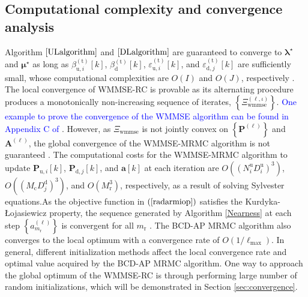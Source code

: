 \documentclass[9pt,journal]{IEEEtran}
\newcommand{\paren}[1]{\left({#1}\right)}
\newcommand{\bracket}[1]{{\left [{#1}\right ]}}
\newcommand{\braces}[1]{{\left\{ {#1}\right\}}}
\newcommand{\rr}{_\mathrm{r}}
\newcommand{\PiB}{\mathbf{P}_{\textrm{u},i}\bracket{k}}
\newcommand{\PBj}{\mathbf{P}_{\textrm{d},j}\bracket{k}}
\newcommand{\sfrac}[2]{#1/#2}
\theoremstyle{definition}
\begin{document}
\subsection{Computational complexity and convergence analysis}
Algorithm $\ref{ULalgorithm}$ and $\ref{DLalgorithm}$ are guaranteed to converge to $\boldsymbol{\lambda}^\star$ and $\boldsymbol{\mu}^\star$ as long as $\beta^{\paren{\mathrm{t}}}_{\textrm{u},i}\bracket{k}$, $\beta^{\paren{\mathrm{t}}}_{\textrm{d}}\bracket{k}$, $\varepsilon^{\paren{\mathrm{t}}}_{\textrm{u},i}\bracket{k}$, and $\varepsilon^{\paren{\mathrm{t}}}_{\textrm{d},j}\bracket{k}$ are sufficiently small, whose computational complexities are $O\paren{\mathit{I}}$ and $O\paren{\mathit{J}}$, respectively \cite{Lui2006subg}. The local convergence of WMMSE-RC is provable as its alternating procedure produces a monotonically non-increasing sequence of iterates, $\braces{\Xi^{\paren{\ell,\iota}}_{\textrm{wmmse}}}$. \textcolor{blue}{One example to prove the convergence of the WMMSE algorithm can be found in Appendix C of \cite{Luo2011IterativeWMMSE}}. However, as $\Xi_{\textrm{wmmse}}$ is not jointly convex on $\braces{\mathbf{P}^{\paren{\ell}}}$ and $\mathbf{A}^{\paren{\ell}}$, the global convergence of the WMMSE-MRMC algorithm is not guaranteed \cite{Luo2011IterativeWMMSE,FD_WMMSE}. The computational costs for the WMMSE-MRMC algorithm to update $\PiB$, $\PBj$, and $\mathbf{a}\bracket{k}$ at each iteration are $\mathit{O}\paren{\paren{N^\textrm{u}_iD^\textrm{u}_{i}}^3}$, $\mathit{O}\paren{\paren{M_{\textrm{c}}D^\textrm{d}_{j}}^3}$, and $\mathit{O}\paren{M_{\textrm{r}}^3}$, respectively, as a result of solving Sylvester equations.As the objective function in $\paren{\ref{radarmiop}}$ satisfies the Kurdyka-\L ojasiewicz property, the sequence generated by Algorithm \ref{Nearness} at each step $\braces{a^{\paren{\ell}}_{m\rr}}$ is convergent for all $m\rr$ \cite{arXiv180203889Z}. The BCD-AP MRMC algorithm also converges to the local optimum with a convergence rate of $\mathit{O}\paren{\sfrac{1}{\mathrm{\ell}_{\textrm{max}}}}$\cite{BCDconvergence}. 
In general, different initialization methods affect the local convergence rate and optimal value acquired by the BCD-AP MRMC algorithm. One way to approach the global optimum of the WMMSE-RC is through performing large number of random initializations, which will be demonstrated in Section \ref{sec:convergence}.
\end{document}
